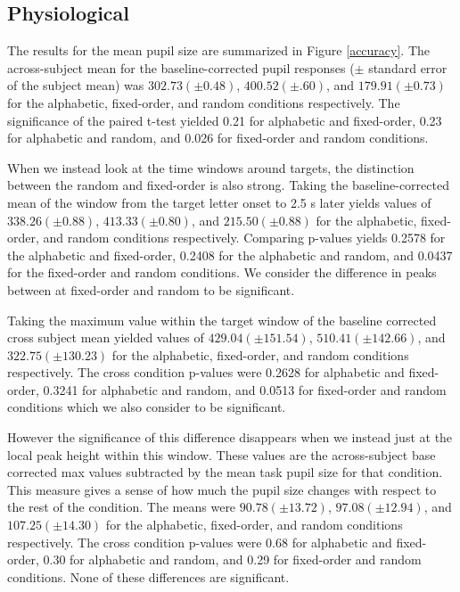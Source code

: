 \documentclass[10pt]{article}
\begin{document}
\subsection{Physiological}

The results for the mean pupil size are summarized in Figure \ref{accuracy}.
The across-subject mean for the baseline-corrected pupil responses
($\pm$ standard error of the subject mean) was $ 302.73 (\pm
0.48)$,
$400.52 (\pm .60)$, and $179.91 (\pm 0.73)$ for the alphabetic,
fixed-order, and random conditions respectively.
The significance of the paired t-test
yielded 0.21 for alphabetic and fixed-order, 0.23 for alphabetic
and random, and 0.026 for fixed-order and random conditions.

When we instead look at the time windows around targets, the distinction
between the random and fixed-order is also strong.  Taking
the baseline-corrected mean of the window from the target letter
onset to 2.5 s later yields values of $338.26 (\pm 0.88)$,
$413.33 (\pm 0.80)$, and $215.50 (\pm 0.88)$ for the alphabetic,
fixed-order, and random conditions respectively.  Comparing p-values
yields 0.2578 for the alphabetic and fixed-order, 0.2408 for the
alphabetic and random, and 0.0437 for the fixed-order and random conditions.
We consider the difference in peaks between at fixed-order and
random to be significant.

Taking the maximum value within the target window of the baseline
corrected cross subject mean yielded  values of $429.04 (\pm
151.54)$, $510.41 (\pm 142.66)$, and $322.75 (\pm 130.23)$ for
the alphabetic, fixed-order, and random conditions respectively.
The cross condition p-values were 0.2628 for alphabetic and
fixed-order, 0.3241 for alphabetic and random, and 0.0513 for
fixed-order and random conditions which we also consider to be significant.

However the significance of this difference disappears when we
instead just at the local peak height within this window.  These
values are the across-subject base corrected max values subtracted
by the mean task pupil size for that condition.  This measure gives
a sense of how much the pupil size changes with respect to the rest
of the condition. The means were $90.78 (\pm 13.72)$, $97.08 (\pm
12.94)$, and $107.25 (\pm 14.30)$ for the alphabetic,
fixed-order, and random conditions respectively.  The cross
condition p-values were 0.68 for alphabetic and fixed-order,
0.30 for alphabetic and random, and 0.29 for fixed-order and
random conditions.  None of these differences are significant.
\end{document}

